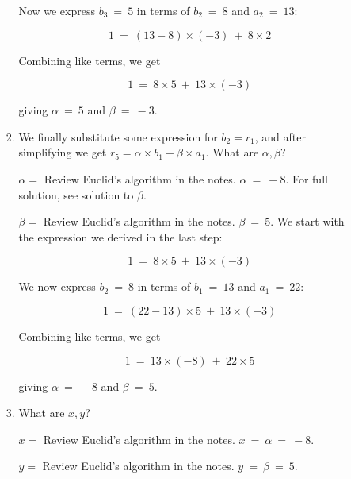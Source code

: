 \documentclass[11pt, preview]{standalone} %
\begin{document}
\begin{enumerate}
\begin{enumerate}
\begin{enumerate}
\begin{Freeform}{-3}
Now we express $b_3\ =\ 5$ in terms of $b_2\ =\ 8$ and $a_2\ =\ 13$:

$$1\ =\ (13 - 8) \times (-3)\ +\ 8 \times 2$$

Combining like terms, we get 

$$1\ =\ 8 \times 5\ +\ 13 \times (-3)$$

giving $\alpha\ =\ 5$ and $\beta\ =\ -3$.
\end{Freeform}
\item We finally substitute some expression for $b_2 = r_1$, and after simplifying we get $r_5 = \alpha \times b_1 + \beta\times a_1$. What are $\alpha, \beta$?
\begin{Freeform}{-8}
$\alpha = $
\Hint Review Euclid's algorithm in the notes.
\Solution $\alpha\ =\ -8$. For full solution, see solution to $\beta$.
\end{Freeform}
\begin{Freeform}{5}
$\beta = $
\Hint Review Euclid's algorithm in the notes.
\Solution $\beta\ =\ 5$. We start with the expression we derived in the last step:

$$1\ =\ 8 \times 5\ +\ 13 \times (-3)$$

We now express $b_2\ =\ 8$ in terms of $b_1\ =\ 13$ and $a_1\ =\ 22$:

$$1\ =\ (22 - 13)\times 5\ +\ 13 \times (-3)$$

Combining like terms, we get

$$1\ =\ 13 \times (-8)\ +\ 22 \times 5$$

giving $\alpha\ =\ -8$ and $\beta\ =\ 5$.
\end{Freeform}
\item  What are $x, y$?
\begin{Freeform}{-8}
$x = $
\Hint Review Euclid's algorithm in the notes.
\Solution $x\ =\ \alpha\ =\ -8$.
\end{Freeform}
\begin{Freeform}{5}
$y = $
\Hint Review Euclid's algorithm in the notes.
\Solution $y\ =\ \beta\ =\ 5$.
\end{Freeform}
\end{enumerate}
\end{enumerate}
\end{enumerate}
\end{document}

